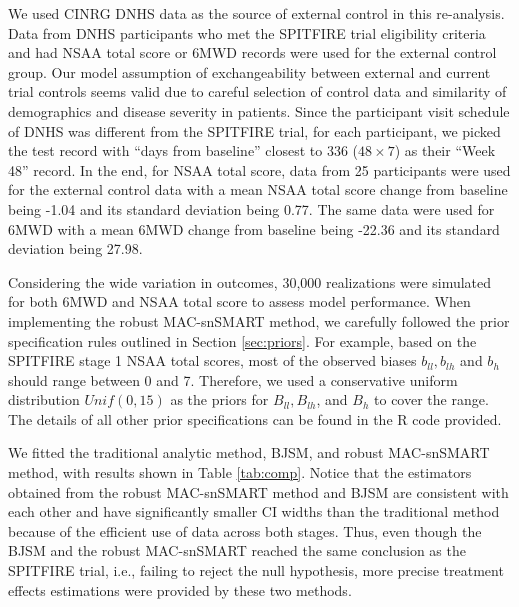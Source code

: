 We used \ac{CINRG} \ac{DNHS} data as the source of external control in this re-analysis. Data from \ac{DNHS} participants who met the SPITFIRE trial eligibility criteria and had \ac{NSAA} total score or \ac{6MWD} records were used for the external control group. Our model assumption of exchangeability between external and current trial controls seems valid due to careful selection of control data and similarity of demographics and disease severity in patients. Since the participant visit schedule of \ac{DNHS} was different from the SPITFIRE trial, for each participant, we picked the test record with ``days from baseline'' closest to 336 ($48 \times 7$) as their ``Week 48'' record. In the end, for \ac{NSAA} total score, data from 25 participants were used for the external control data with a mean \ac{NSAA} total score change from baseline being -1.04 and its standard deviation being 0.77. The same data were used for \ac{6MWD} with a mean \ac{6MWD} change from baseline being -22.36 and its standard deviation being 27.98.

Considering the wide variation in outcomes, 30,000 realizations were simulated for both \ac{6MWD} and \ac{NSAA} total score to assess model performance. When implementing the robust MAC-snSMART method, we carefully followed the prior specification rules outlined in Section \ref{sec:priors}. For example, based on the SPITFIRE stage 1 \ac{NSAA} total scores, most of the observed biases $b_{ll}, b_{lh}$ and $b_h$ should range between 0 and 7. Therefore, we used a conservative uniform distribution $Unif(0, 15)$ as the priors for $B_{ll}, B_{lh}$, and $B_h$ to cover the range. The details of all other prior specifications can be found in the R code provided. 

We fitted the traditional analytic method, \ac{BJSM}, and robust MAC-snSMART method, with results shown in Table \ref{tab:comp}. Notice that the estimators obtained from the robust MAC-snSMART method and \ac{BJSM} are consistent with each other and have significantly smaller \ac{CI} widths than the traditional method because of the efficient use of data across both stages. Thus, even though the \ac{BJSM} and the robust MAC-snSMART reached the same conclusion as the SPITFIRE trial, i.e., failing to reject the null hypothesis, more precise treatment effects estimations were provided by these two methods.  

